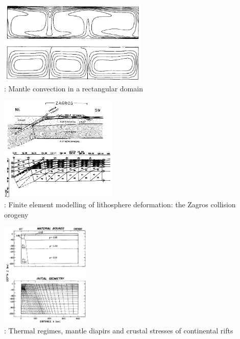 \begin{center}
\includegraphics[height=4cm]{images/history/ludt79}\\
{: Mantle convection in a rectangular domain \cite{ludt79}}
\end{center}


\begin{center}
\begin{minipage}{0.45\textwidth}
\centering
\includegraphics[height=5cm]{images/history/bird78b}\\
{: Finite element modelling of lithosphere deformation: the Zagros collision 
orogeny \cite{bird78b}}
\end{minipage}\hfill
\begin{minipage}{0.45\textwidth}
\centering
\includegraphics[height=5cm]{images/history/brpo81}\\
{: Thermal regimes, mantle diapirs and crustal stresses of continental rifts \cite{brpo81}}
\end{minipage}
\end{center}


